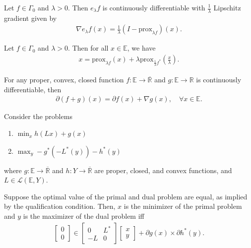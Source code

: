 \documentclass{tufte-handout}
\begin{document}
\begin{Corollary}
    Let \( f \in \Gamma_0 \) and \( \lambda>0 \). Then 
    \( e_\lambda f \) is continuously differentiable with \( \frac1\lambda \) Lipschitz gradient
    given by 
    \begin{align}
        \nabla e_\lambda f(x) = \frac{1}{\lambda}(I - \text{prox}_{\lambda f})(x).
    \end{align}
\end{Corollary}

\begin{Theorem}
    Let \( f \in \Gamma_0 \) and \( \lambda > 0 \). Then for all \( x \in \mathbb{E} \), we have
    \begin{align}
        x = \text{prox}_{\lambda f}(x) + \lambda \text{prox}_{\frac{1}{\lambda} f^*}\left(\frac{x}{\lambda}\right).
    \end{align}
\end{Theorem}

\begin{Proposition}
    For any proper, convex, closed function \( f:\mathbb{E}\to \overline{\mathbb{R}} \) and \(g: \mathbb{E} \to \mathbb{R} \) is 
    continuously differentiable, then
    \begin{align}
        \partial (f + g)(x) = \partial f(x) + \nabla g(x), \quad \forall x \in \mathbb{E}.
    \end{align}
\end{Proposition}

\begin{Corollary}
    Consider the problems
    \begin{enumerate}
        \item[P.] \(\min_x h(Lx) + g(x)\)
        \item[D.] \(\max_y -g^*(-L^*(y))-h^*(y)\)
    \end{enumerate}
    where \( g: \mathbb{E} \to \overline{\mathbb{R}}\) and \( h: Y \to \overline{\mathbb{R}} \) 
    are proper, closed, and convex functions, and \( L \in \mathcal{L}(\mathbb{E}, Y) \).

    Suppose the optimal value of the primal and dual problem are equal, as implied by the qualification condition.
    Then, \( x \) is the minimizer of the primal problem and \( y \) is the maximizer of the dual problem iff
    \begin{align}
        \begin{bmatrix}
            0 \\ 0
        \end{bmatrix}
        \in \begin{bmatrix}
            0 & L^* \\
            -L & 0
        \end{bmatrix}
        \begin{bmatrix}
            x \\ y
        \end{bmatrix}
        +
        \partial g(x) \times \partial h^*(y).
    \end{align}
\end{Corollary}
\end{document}
